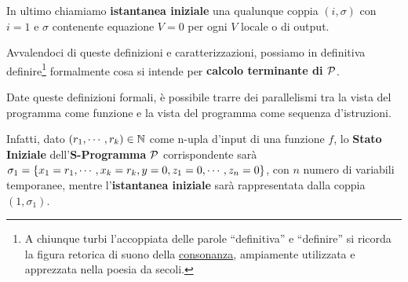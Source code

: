 In ultimo chiamiamo \textbf{istantanea iniziale} una qualunque coppia \((i,\sigma)\) con \(i=1\) e \(\sigma\) contenente equazione \(V=0\) per ogni \(V\) locale o di output.

Avvalendoci di queste definizioni e caratterizzazioni, possiamo in definitiva definire\footnote{A chiunque turbi l'accoppiata delle parole ``definitiva'' e ``definire'' si ricorda la figura retorica di suono della \href{https://en.wikipedia.org/wiki/Literary_consonance}{consonanza}, ampiamente utilizzata e apprezzata nella poesia da secoli.} formalmente cosa si intende per \textbf{calcolo terminante di \(\mathcal{P}\)}.

Date queste definizioni formali, è possibile trarre dei parallelismi tra la vista del programma come funzione e la vista del programma come sequenza d'istruzioni.

Infatti, dato \((r_1,\cdots,r_k)\in\mathbb{N}\) come n-upla d'input di una funzione \(f\), lo \textbf{Stato Iniziale} dell'\textbf{S-Programma} \(\mathcal{P}\) corrispondente sarà
\(\sigma_1 = \displaystyle{\left\{{x_1=r_1,\cdots,x_k=r_k,y=0,z_1=0,\cdots,z_n=0}\right\}}\), con \(n\) numero di variabili temporanee, %
mentre l'\textbf{istantanea iniziale} sarà rappresentata dalla coppia \((1,\sigma_1)\).

